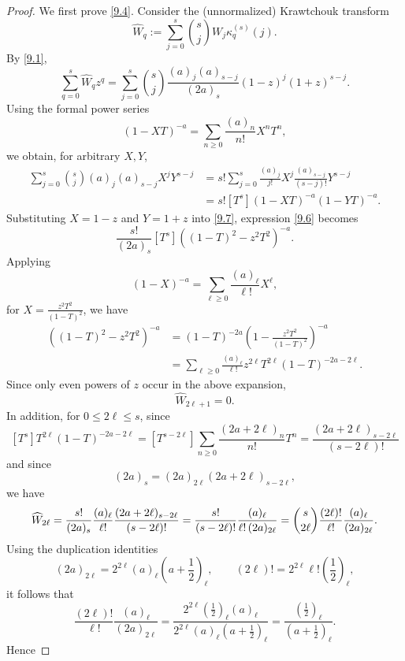 \documentclass[10pt,a4paper]{amsart}
\theoremstyle{definition}
\begin{document}
\begin{proof}
We first prove \eqref{9.4}.  Consider the (unnormalized) Krawtchouk
transform
\[
\widehat W_q
:=
\sum_{j=0}^s\binom{s}{j}W_j\kappa_q^{(s)}(j).
\]
By \eqref{9.1},
\begin{equation}\label{9.6}
\sum_{q=0}^s\widehat W_qz^q
=
\sum_{j=0}^s
\binom{s}{j}
\frac{(a)_j(a)_{s-j}}{(2a)_s}
(1-z)^j(1+z)^{s-j}.
\end{equation}
Using the formal power series
\[
(1-XT)^{-a}
=
\sum_{n\ge0}\frac{(a)_n}{n!}X^nT^n,
\]
we obtain, for arbitrary $X,Y$,
\begin{equation}\label{9.7}
\begin{aligned}
\sum_{j=0}^s
\binom{s}{j}(a)_j(a)_{s-j}X^jY^{s-j}
&=
s! 
\sum_{j=0}^s
\frac{(a)_j}{j!}X^j\frac{(a)_{s-j}}{(s-j)!}Y^{s-j}
\\
&=
s![T^s](1-XT)^{-a}(1-YT)^{-a}.
\end{aligned}
\end{equation}
Substituting $X=1-z$ and $Y=1+z$ into \eqref{9.7}, 
expression \eqref{9.6} becomes
\[
\frac{s!}{(2a)_s}[T^s]
\left((1-T)^2-z^2T^2\right)^{-a}.
\]
Applying  
\[
(1-X)^{-a}
=
\sum_{\ell \ge0}\frac{(a)_\ell}{\ell!}X^\ell,
\]
for $X = \frac{z^2T^2}{(1-T)^2}$, we have
\[
\begin{aligned}
\left((1-T)^2-z^2T^2\right)^{-a}
&=
(1-T)^{-2a}
\left(1-\frac{z^2T^2}{(1-T)^2}\right)^{-a}\\
&=
\sum_{\ell\ge0}
\frac{(a)_\ell}{\ell!}
z^{2\ell}T^{2\ell}(1-T)^{-2a-2\ell}.
\end{aligned}
\]
Since only even powers of \(z\) occur in the above expansion,
\[
\widehat W_{2\ell+1}=0.
\]
In addition, for $0\le2\ell\le s$, 
since
\[
[T^s] T^{2\ell}(1-T)^{-2a-2\ell}
=
[T^{s-2\ell }] \sum_{n \ge0}\frac{(2 a + 2\ell)_n}{n!}T^n
=
\frac{(2 a + 2\ell)_{s-2\ell}}{(s-2\ell)!}
\]
and since
\[
(2a)_s=(2a)_{2\ell}(2a+2\ell)_{s-2\ell},
\]
we have
\[
\widehat W_{2\ell}
=
\frac{s!}{(2a)_s}
\frac{(a)_\ell}{\ell!}
\frac{(2a+2\ell)_{s-2\ell}}{(s-2\ell)!}\\
=
\frac{s!}{(s-2\ell)!}
\frac{(a)_\ell}
     {\ell!\,(2a)_{2\ell}}
=
\binom{s}{2\ell}
\frac{(2\ell)!}{\ell!}
\frac{(a)_\ell}
     {(2a)_{2\ell}}.
\]
Using the duplication identities
\[
(2a)_{2\ell}
=
2^{2\ell}(a)_\ell
\left(a+\frac12\right)_\ell,
\qquad
(2\ell)!
=
2^{2\ell}\ell!
\left(\frac12\right)_\ell,
\]
it follows that
\[
\frac{(2\ell)!}{\ell!}
\frac{(a)_\ell}
     {(2a)_{2\ell}}
=
\frac{
2^{2\ell}(\frac12)_\ell (a)_\ell
}{
2^{2\ell}(a)_\ell (a+\frac12)_\ell
}
=
\frac{(\frac12)_\ell}
     {(a+\frac12)_\ell}.
\]
Hence

\end{proof}
\end{document}
